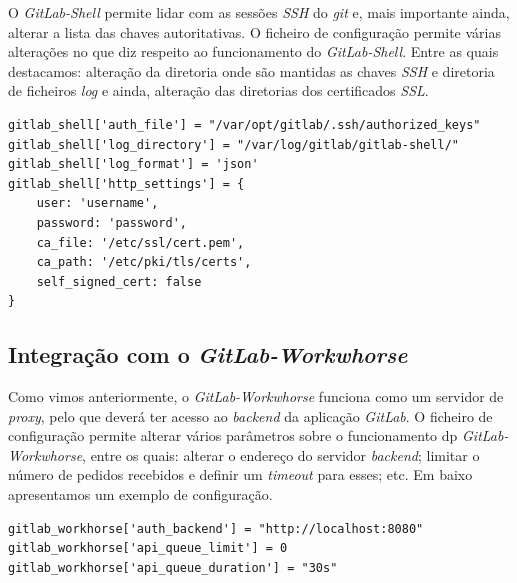 \documentclass[12pt,a4paper]{article}
\begin{document}
O \emph{GitLab-Shell} permite lidar com as sessões \emph{SSH} do \emph{git} e, mais importante ainda, alterar a lista das chaves autoritativas. O ficheiro de configuração permite várias alterações no que diz respeito ao funcionamento do \emph{GitLab-Shell}. Entre as quais destacamos: alteração da diretoria onde são mantidas as chaves \emph{SSH} e diretoria de ficheiros \emph{log} e ainda, alteração das diretorias dos certificados \emph{SSL}.

\begin{verbatim}
gitlab_shell['auth_file'] = "/var/opt/gitlab/.ssh/authorized_keys"
gitlab_shell['log_directory'] = "/var/log/gitlab/gitlab-shell/"
gitlab_shell['log_format'] = 'json'
gitlab_shell['http_settings'] = { 
    user: 'username', 
    password: 'password', 
    ca_file: '/etc/ssl/cert.pem', 
    ca_path: '/etc/pki/tls/certs', 
    self_signed_cert: false
}
\end{verbatim}

\subsection{Integração com o \emph{GitLab-Workwhorse}}

Como vimos anteriormente, o \emph{GitLab-Workwhorse} funciona como um servidor de \emph{proxy}, pelo que deverá ter acesso ao \emph{backend} da aplicação \emph{GitLab}. O ficheiro de configuração permite alterar vários parâmetros sobre o funcionamento dp \emph{GitLab-Workwhorse}, entre os quais: alterar o endereço do servidor \emph{backend}; limitar o número de pedidos recebidos e definir um \emph{timeout} para esses; etc. Em baixo apresentamos um exemplo de configuração. 

\begin{verbatim}
gitlab_workhorse['auth_backend'] = "http://localhost:8080"
gitlab_workhorse['api_queue_limit'] = 0
gitlab_workhorse['api_queue_duration'] = "30s"
\end{verbatim}
\end{document}

